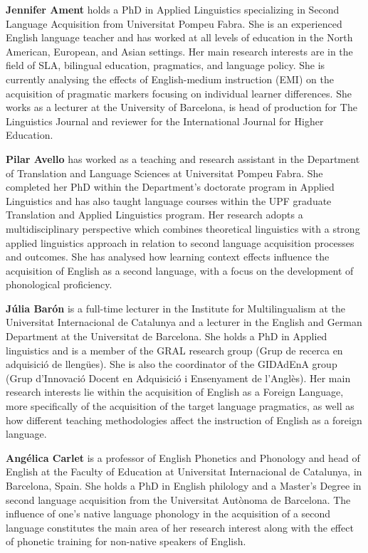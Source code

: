 
\textbf{Jennifer Ament} holds a PhD in Applied Linguistics specializing in Second Language Acquisition from Universitat Pompeu Fabra. She is an experienced {English} language teacher and has worked at all levels of education in the North American, European, and Asian settings. Her main research interests are in the field of {SLA}, bilingual education, {pragmatics}, and {language policy}. She is currently analysing the effects of {English}-medium instruction ({EMI}) on the {acquisition} of {pragmatic} markers focusing on individual learner differences. She works as a lecturer at the University of Barcelona, is head of production for The {Linguistics} Journal and reviewer for the International Journal for Higher Education. 

\textbf{Pilar Avello} has worked as a teaching and research assistant in the Department of Translation and Language Sciences at Universitat Pompeu Fabra. She completed her PhD within the Department’s doctorate program in Applied {Linguistics} and has also taught language courses within the UPF graduate Translation and Applied {Linguistics} program. Her research adopts a multidisciplinary perspective which combines theoretical linguistics with a strong applied linguistics approach in relation to second language {acquisition} processes and outcomes. She has analysed how {learning context} effects influence the {acquisition} of {English} as a second language, with a focus on the development of {phonological} {proficiency}.

\textbf{Júlia Barón} is a full-time lecturer in the Institute for Multilingualism at the Universitat Internacional de Catalunya and a lecturer in the {English} and {German} Department at the Universitat de Barcelona. She holds a PhD in Applied linguistics and is a member of the GRAL research group (Grup de recerca en adquisició de llengües). She is also the coordinator of the GIDAdEnA group (Grup d'Innovació Docent en Adquisició i Ensenyament de l'Anglès). Her main research interests lie within the {acquisition} of {English} as a Foreign Language, more specifically of the {acquisition} of the {target language} {pragmatics}, as well as how different teaching methodologies affect the instruction of {English} as a {foreign language}.

\newpage 
\textbf{Angélica Carlet} is a professor of {English} Phonetics and Phonology and head of {English} at the Faculty of Education at Universitat Internacional de Catalunya, in Barcelona, Spain. She holds a PhD in {English} philology and a Master’s Degree in second language {acquisition} from the Universitat Autònoma de Barcelona. The influence of one’s native language {phonology} in the {acquisition} of a second language constitutes the main area of her research interest along with the effect of {phonetic} training for non-native speakers of {English}. 


